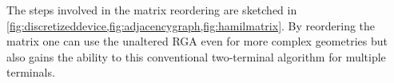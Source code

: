 The steps involved in the matrix reordering are sketched in \cref{fig:discretizeddevice,fig:adjacencygraph,fig:hamilmatrix}.
By reordering the matrix one can use the unaltered RGA even for more complex geometries but also gains the ability to this conventional two-terminal algorithm for multiple terminals.
\FloatBarrier
